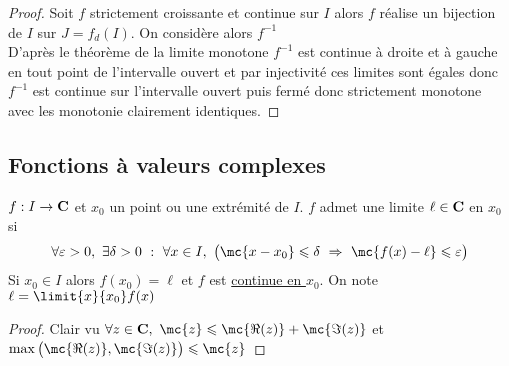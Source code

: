     ${}$ \\ 
    \begin{proof}
    Soit $f$ strictement croissante et continue sur $I$ alors $f$ réalise un bijection de $I$ sur $J=f_d(I)$. On considère alors $f^{-1}$\\
    D'après le théorème de la limite monotone $f^{-1}$ est continue à droite et à gauche en tout point de l'intervalle ouvert et par injectivité ces limites sont égales donc $f^{-1}$ est continue sur l'intervalle ouvert puis fermé donc strictement monotone avec les monotonie clairement identiques.
    \end{proof}
\subsection{Fonctions à valeurs complexes}
    $f : I \rightarrow {\mathbf{C}}$ et $x_0$ un point ou une extrémité de $I$. $f$ admet une limite $\ell\in {\mathbf{C}}$ en $x_0$ si \[ \forall \varepsilon >0 ,~\exists \delta>0 ~:~\forall x\in I,~\big( \mc{x-x_0} \leqslant\delta ~\Rightarrow~\mc{f(x)-\ell}\leqslant\varepsilon\big)\]
    Si $x_0\in I$ alors $f(x_0) = \ell$ et $f$ est \uline{continue en $x_0$}. On note $\ell = \limit{x}{x_0} f(x)$
    \vspace*{0.5cm} \\ 
    \begin{proof}
    Clair vu $\forall z\in \C ,~\mc{z} \leqslant \mc{\Re(z)} + \mc{\Im(z)}$ et $\max \big(\mc{\Re(z)} , \mc{\Im(z)} \big) \leqslant \mc{z}$
    \end{proof}
